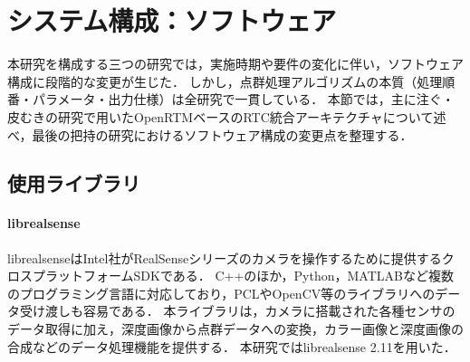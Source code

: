 

\section{システム構成：ソフトウェア}
\label{sec:system:software}

本研究を構成する三つの研究では，実施時期や要件の変化に伴い，ソフトウェア構成に段階的な変更が生じた．
しかし，点群処理アルゴリズムの本質（処理順番・パラメータ・出力仕様）は全研究で一貫している．
本節では，主に注ぐ・皮むきの研究で用いたOpenRTMベースのRTC統合アーキテクチャについて述べ，最後の把持の研究におけるソフトウェア構成の変更点を整理する．

\subsection{使用ライブラリ}
\label{sec:system:software:libraries}

\paragraph{librealsense}

librealsenseはIntel社がRealSenseシリーズのカメラを操作するために提供するクロスプラットフォームSDKである．
C++のほか，Python，MATLABなど複数のプログラミング言語に対応しており，PCLやOpenCV等のライブラリへのデータ受け渡しも容易である．
本ライブラリは，カメラに搭載された各種センサのデータ取得に加え，深度画像から点群データへの変換，カラー画像と深度画像の合成などのデータ処理機能を提供する．
本研究ではlibrealsense 2.11を用いた．

